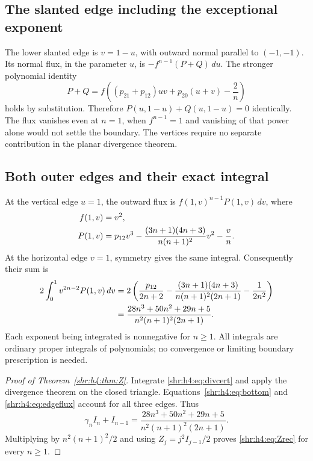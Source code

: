 \documentclass[11pt,letterpaper]{article}
\numberwithin{equation}{section}
\theoremstyle{definition}
\newcommand{\1}{\mathbf 1}
\newcommand{\dd}{\,d}
\begin{document}
\subsection{The slanted edge including the exceptional exponent}
The lower slanted edge is $v=1-u$, with outward normal parallel to
$(-1,-1)$. Its normal flux, in the parameter $u$, is
$-f^{n-1}(P+Q)\dd u$. The stronger polynomial identity
\begin{equation}
 P+Q=f\left((p_{21}+p_{12})uv+p_{20}(u+v)-\frac2n\right)
 \label{shr:h4:eq:bottom}
\end{equation}
holds by substitution. Therefore $P(u,1-u)+Q(u,1-u)=0$ identically.
The flux vanishes even at $n=1$, when $f^{n-1}=1$ and vanishing of that
power alone would not settle the boundary. The vertices require no
separate contribution in the planar divergence theorem.

\subsection{Both outer edges and their exact integral}
At the vertical edge $u=1$, the outward flux is
$f(1,v)^{n-1}P(1,v)\dd v$, where
\begin{align}
 f(1,v)&=v^2,\notag\\
 P(1,v)&=p_{12}v^3
 -\frac{(3n+1)(4n+3)}{n(n+1)^2}v^2-\frac vn.
 \label{shr:h4:eq:edge}
\end{align}
At the horizontal edge $v=1$, symmetry gives the same integral.
Consequently their sum is
\begin{align}
 2\int_0^1v^{2n-2}P(1,v)\dd v
 &=2\left(\frac{p_{12}}{2n+2}
 -\frac{(3n+1)(4n+3)}{n(n+1)^2(2n+1)}-\frac1{2n^2}\right)\notag\\
 &=\frac{28n^3+50n^2+29n+5}{n^2(n+1)^2(2n+1)}.
 \label{shr:h4:eq:edgeflux}
\end{align}
Each exponent being integrated is nonnegative for $n\ge1$. All integrals
are ordinary proper integrals of polynomials; no convergence or limiting
boundary prescription is needed.

\begin{proof}[Proof of Theorem~\ref{shr:h4:thm:Z}]
Integrate \eqref{shr:h4:eq:divcert} and apply the divergence theorem on the
closed triangle. Equations~\eqref{shr:h4:eq:bottom} and \eqref{shr:h4:eq:edgeflux}
account for all three edges. Thus
\[
 \gamma_n I_n+I_{n-1}
 =\frac{28n^3+50n^2+29n+5}{n^2(n+1)^2(2n+1)}.
\]
Multiplying by $n^2(n+1)^2/2$ and using $Z_j=j^2I_{j-1}/2$ proves
\eqref{shr:h4:eq:Zrec} for every $n\ge1$.
\end{proof}
\end{document}
